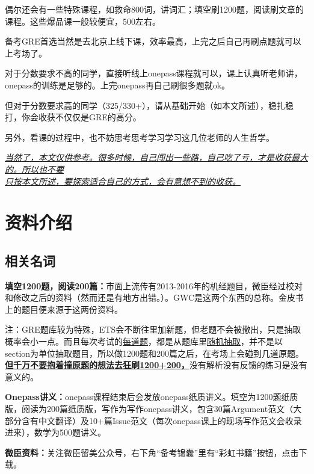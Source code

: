 \documentclass[cn,plain]{./src/qyxfbook}
\newcommand{\red}[1]{\textcolor[rgb]{1,0,0}{#1}}
\begin{document}
偶尔还会有一些特殊课程，如救命800词，讲词汇；填空刷1200题，阅读刷文章的课程。这些爆品课一般较便宜，500左右。

备考GRE首选当然是去北京上线下课，效率最高，上完之后自己再刷点题就可以上考场了。

对于分数要求不高的同学，直接听线上onepass课程就可以，课上认真听老师讲，onepass的训练是足够的。上完onepass再自己刷很多题就ok。

但对于分数要求高的同学（325/330+），请从基础开始（如本文所述），稳扎稳打，你会收获不仅仅是GRE的高分。

另外，看课的过程中，也不妨思考思考学习学习这几位老师的人生哲学。

\underline{\itshape 当然了，本文仅供参考。很多时候，自己闯出一些路，自己吃了亏，才是收获最大的。所以也\LARGE 不要}\\
\underline{\itshape \LARGE 只按本文所述，\normalsize 要\LARGE 探索\normalsize 适合自己的方式，会有意想不到的收获。}

\section{资料介绍}

\subsection{相关名词}

	\textbf{填空1200题，阅读200篇：}市面上流传有2013-2016年的机经题目，微臣经过校对和修改之后的资料（然而还是有地方出错。）。GWC是这两个东西的总称。金皮书上的题目便来源于这两份资料。\par
注：GRE题库较为特殊，ETS会不断往里加新题，但老题不会被撤出，只是抽取概率会小一点。而且每次考试的\underline{每道题}，都是从题库里\underline{随机抽取}，并不是以section为单位抽取题目，所以做1200题和200篇之后，在考场上会碰到几道原题。\red{\underline{\Large \bfseries 但千万不要抱着撞原题的想法去狂刷1200+200，}}没有解析没有反馈的练习是没有意义的。\par

\textbf{Onepass讲义：}onepass课程结束后会发放onepass纸质讲义。填空为1200题纸质版，阅读为200篇纸质版，写作为写作onepass讲义，包含30篇Argument范文（大部分含有中文翻译）及10+篇Issue范文（每次onepass课上的现场写作范文会收录进来），数学为500题讲义。\par

\textbf{微臣资料：}关注微臣留美公众号，右下角“备考锦囊”里有“彩虹书籍”按钮，点击下载。
\end{document}
